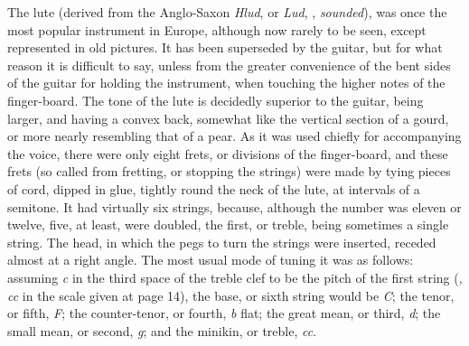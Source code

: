 The lute (derived from the Anglo-Saxon \textit{Hlud}, or \textit{Lud}, \ie, \textit{sounded}), was
once the most popular instrument in Europe, although now rarely to be seen,
except represented in old pictures. It has been superseded by the guitar, but
for what reason it is difficult to say, unless from the greater convenience of the
bent sides of the guitar for holding the instrument, when touching the higher notes
of the finger-board. The tone of the lute is decidedly superior to the guitar, being
larger, and having a convex back, somewhat like the vertical section of a gourd, or
more nearly resembling that of a pear. As it was used chiefly for accompanying
the voice, there were only eight frets, or divisions of the finger-board, and these
frets (so called from fretting, or stopping the strings) were made by tying
pieces of cord, dipped in glue, tightly round the neck of the lute, at intervals
of a semitone. It had virtually six strings, because, although the number
was eleven or twelve, five, at least, were doubled, the first, or treble, being
sometimes a single string.
 The head, \pagebreak in which the pegs to turn the strings were
inserted, receded almost at a right angle. The most usual mode of tuning it was
as follows: assuming \textit{c} in the third space of the treble clef to be the pitch of the
first string (\ie, \textit{cc} in the scale given at page 14), the base, or sixth string would
be \textit{C}; the tenor, or fifth, \textit{F}; the counter-tenor, or fourth, \textit{b} flat; the great
mean, or third, \textit{d}; the small mean, or second, \textit{g}; and the minikin, or treble, \textit{cc}.

